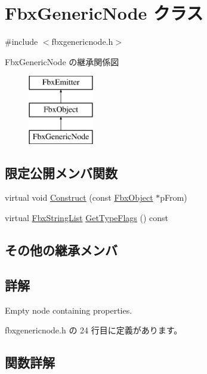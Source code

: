 \hypertarget{class_fbx_generic_node}{}\section{Fbx\+Generic\+Node クラス}
\label{class_fbx_generic_node}


{\ttfamily \#include $<$fbxgenericnode.\+h$>$}

Fbx\+Generic\+Node の継承関係図\begin{figure}[H]
\begin{center}
\leavevmode
\includegraphics[height=3.000000cm]{class_fbx_generic_node}
\end{center}
\end{figure}
\subsection*{限定公開メンバ関数}
\begin{DoxyCompactItemize}
\item 
virtual void \hyperlink{class_fbx_generic_node_a63ff7b8adb2ddc1803f74b9afce50fc2}{Construct} (const \hyperlink{class_fbx_object}{Fbx\+Object} $\ast$p\+From)
\item 
virtual \hyperlink{class_fbx_string_list}{Fbx\+String\+List} \hyperlink{class_fbx_generic_node_a348566f1d9605e11b70a36cda95c9afb}{Get\+Type\+Flags} () const
\end{DoxyCompactItemize}
\subsection*{その他の継承メンバ}


\subsection{詳解}
Empty node containing properties. 

 fbxgenericnode.\+h の 24 行目に定義があります。



\subsection{関数詳解}
\mbox{\label{class_fbx_generic_node_a63ff7b8adb2ddc1803f74b9afce50fc2}} 
